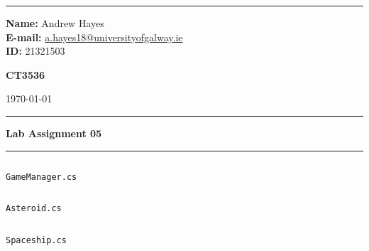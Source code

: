\documentclass[a4paper, 11pt]{article}
\newenvironment{code}{\captionsetup{type=listing}}{}
\begin{document}
\hrule \medskip
\begin{minipage}{0.295\textwidth} 
    \raggedright
    \footnotesize 
    \textbf{Name:} Andrew Hayes \\
    \textbf{E-mail:} \href{mailto://a.hayes18@universityofgalway.ie}{a.hayes18@universityofgalway.ie}  \hfill\\   
    \textbf{ID:} 21321503 \hfill
\end{minipage}
\begin{minipage}{0.4\textwidth} 
    \centering 
    \vspace{0.4em}
    \Large 
    \textbf{CT3536} \\ 
\end{minipage}
\begin{minipage}{0.295\textwidth} 
    \raggedleft
    \today
\end{minipage}
\medskip\hrule 
\begin{center}
    \normalsize
    \textbf{Lab Assignment 05}
\end{center}
\hrule

\begin{code}
    \inputminted[texcl, mathescape, breaklines, frame=single, linenos]{csharp}{../code/GameManager.cs}
\caption{\texttt{GameManager.cs}}
\end{code}

\begin{code}
\inputminted[texcl, mathescape, breaklines, frame=single, linenos]{csharp}{../code/Asteroid.cs}
\caption{\texttt{Asteroid.cs}}
\end{code}

\begin{code}
\inputminted[texcl, mathescape, breaklines, frame=single, linenos]{csharp}{../code/Spaceship.cs}
\caption{\texttt{Spaceship.cs}}
\end{code}
\end{document}
